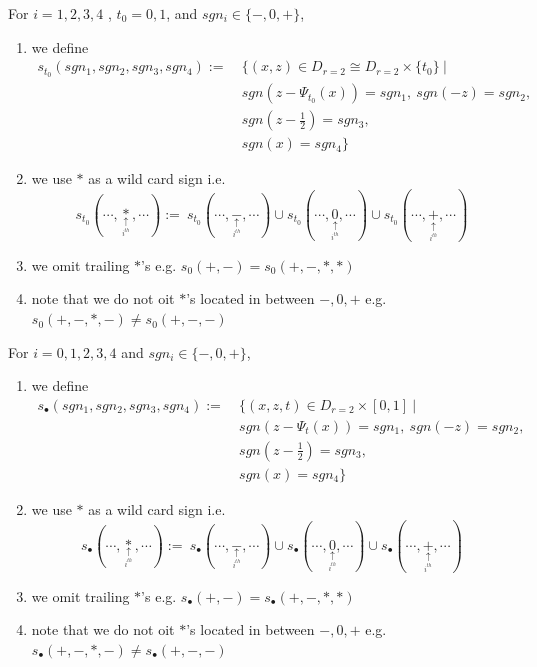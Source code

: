 \begin{definition}
For $i = 1,2,3,4$ , $t_0 = 0,1$, and $sgn_i \in \{-,0,+\}$,
\begin{enumerate}
\item we define
\begin{align*}
s_{t_0}(sgn_1,sgn_2,sgn_3,sgn_4):=~ &\{(x,z) \in D_{r=2}\cong D_{r=2}\times \{t_0\} ~| \\
&sgn(z-\Psi_{t_0}(x))=sgn_1,~ sgn(-z)=sgn_2,\\ 
&sgn(z-\frac{1}{2})=sgn_3,\\
&sgn(x)=sgn_4 \}
\end{align*}

\item we use $*$ as a wild card sign i.e. 
\[
s_{t_0}(\cdots,\underset{\underset{i^{th}}{\uparrow}}{*},\cdots):=~ s_{t_0}(\cdots,\underset{\underset{i^{th}}{\uparrow}}{-},\cdots)\cup s_{t_0}(\cdots,\underset{\underset{i^{th}}{\uparrow}}{0},\cdots)\cup s_{t_0}(\cdots,\underset{\underset{i^{th}}{\uparrow}}{+},\cdots)
\]

\item we omit trailing $*$'s e.g. $s_0(+,-) = s_0(+,-,*,*)$

\item note that we do not oit $*$'s located in between $-,0,+$ e.g. $s_0(+,-,*,-) \neq s_0(+,-,-)$

\end{enumerate}
\end{definition}

\begin{definition}
For $i = 0,1,2,3,4$ and $sgn_i \in \{-,0,+\}$,
\begin{enumerate}
\item we define
\begin{align*}
s_{\bullet}(sgn_1,sgn_2,sgn_3,sgn_4):=~ &\{(x,z,t) \in D_{r=2}\times [0,1] ~| \\
&sgn(z-\Psi_{t}(x))=sgn_1,~ sgn(-z)=sgn_2,\\ 
&sgn(z-\frac{1}{2})=sgn_3,\\
&sgn(x)=sgn_4 \}
\end{align*}

\item we use $*$ as a wild card sign i.e. 
\[
s_{\bullet}(\cdots,\underset{\underset{i^{th}}{\uparrow}}{*},\cdots):=~ s_{\bullet}(\cdots,\underset{\underset{i^{th}}{\uparrow}}{-},\cdots)\cup s_{\bullet}(\cdots,\underset{\underset{i^{th}}{\uparrow}}{0},\cdots)\cup s_{\bullet}(\cdots,\underset{\underset{i^{th}}{\uparrow}}{+},\cdots)
\]


\item we omit trailing $*$'s e.g. $s_\bullet(+,-) = s_\bullet(+,-,*,*)$

\item note that we do not oit $*$'s located in between $-,0,+$ e.g. $s_\bullet(+,-,*,-) \neq s_\bullet(+,-,-)$
\end{enumerate}
\end{definition}


